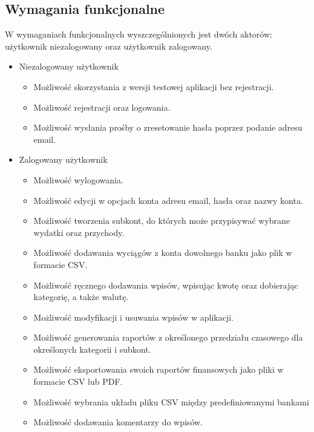 \documentclass{article}
\begin{document}
	\subsection{Wymagania funkcjonalne}
	W wymaganiach funkcjonalnych wyszczególnionych jest dwóch aktorów: użytkownik niezalogowany oraz użytkownik zalogowany.
	\begin{itemize}
		\item Niezalogowany użytkownik
			\begin{itemize}
				\item Możliwość skorzystania z wersji testowej aplikacji bez rejestracji.
				\item Możliwość rejestracji oraz logowania.
				\item Możliwość wysłania prośby o zresetowanie hasła poprzez podanie adresu email.
			\end{itemize}

		\item Zalogowany użytkownik
			\begin{itemize}
				\item Możliwość wylogowania.
				\item Możliwość edycji w opcjach konta adresu email, hasła oraz nazwy konta.
				\item Możliwość tworzenia subkont, do których może przypisywać wybrane wydatki oraz przychody.
				\item Możliwość dodawania wyciągów z konta dowolnego banku jako plik w formacie CSV.
				\item Możliwość ręcznego dodawania wpisów, wpisując kwotę oraz dobierając kategorię, a także walutę.
				\item Możliwość modyfikacji i usuwania wpisów w aplikacji.
				\item Możliwość generowania raportów z określonego przedziału czasowego dla określonych kategorii i subkont.
				\item Możliwość eksportowania swoich raportów finansowych jako pliki w formacie CSV lub PDF.
				\item Możliwość wybrania układu pliku CSV między predefiniowanymi bankami %
				\item Możliwość dodawania komentarzy do wpisów.
			\end{itemize}
	\end{itemize}
\end{document}
